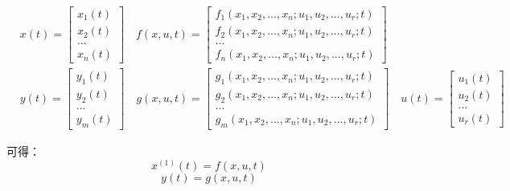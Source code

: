 \documentclass{article}
\numberwithin{equation}{section}
\numberwithin{figure}{section}
\begin{document}
\begin{equation}
    \begin{split}
        &x(t)=
        \begin{bmatrix}
            x_1(t)\\
            x_2(t)\\
            ...\\
            x_n(t)
        \end{bmatrix}
        \quad
        f(x,u,t)=
        \begin{bmatrix}
            f_1(x_1,x_2,...,x_n;u_1,u_2,...,u_r;t)\\
            f_2(x_1,x_2,...,x_n;u_1,u_2,...,u_r;t)\\
            ...\\
            f_n(x_1,x_2,...,x_n;u_1,u_2,...,u_r;t)
        \end{bmatrix}\\
        &y(t)=
        \begin{bmatrix}
            y_1(t)\\
            y_2(t)\\
            ...\\
            y_m(t)
        \end{bmatrix}
        \quad
        g(x,u,t)=
        \begin{bmatrix}
            g_1(x_1,x_2,...,x_n;u_1,u_2,...,u_r;t)\\
            g_2(x_1,x_2,...,x_n;u_1,u_2,...,u_r;t)\\
            ...\\
            g_m(x_1,x_2,...,x_n;u_1,u_2,...,u_r;t)
        \end{bmatrix}
        \quad
        u(t)=
        \begin{bmatrix}
            u_1(t)\\
            u_2(t)\\
            ...\\
            u_r(t)
        \end{bmatrix}
    \end{split}
\end{equation}

可得：
\begin{equation}
    x^{(1)}(t)=f(x,u,t)\label{state equation}
\end{equation}
\begin{equation}
    y(t)=g(x,u,t)\label{output equation}
\end{equation}
\end{document}
